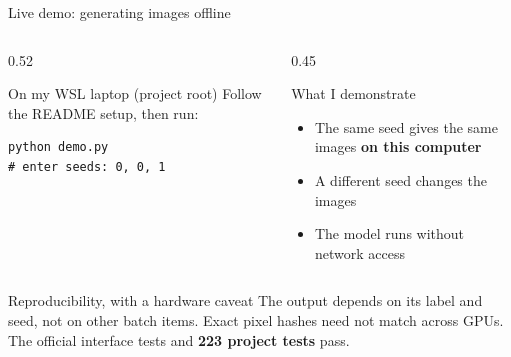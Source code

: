 \documentclass[aspectratio=169,10pt,t]{beamer}
\begin{document}
\begin{frame}[fragile]{Live demo: generating images offline}
\begin{columns}[T]
\begin{column}{0.52\linewidth}
\begin{block}{On my WSL laptop (project root)}
\small Follow the README setup, then run:
\begin{verbatim}
python demo.py
# enter seeds: 0, 0, 1
\end{verbatim}
\end{block}
\end{column}
\begin{column}{0.45\linewidth}
\begin{block}{What I demonstrate}
\small\begin{itemize}\setlength{\itemsep}{1pt}
\item The same seed gives the same images \textbf{on this computer}
\item A different seed changes the images
\item The model runs without network access
\end{itemize}
\end{block}
\end{column}
\end{columns}
\vspace{5pt}
\begin{block}{Reproducibility, with a hardware caveat}
\small The output depends on its label and seed, not on other batch items. Exact pixel hashes need not match across GPUs. The official interface tests and \textbf{223 project tests} pass.
\end{block}
\end{frame}
\end{document}
